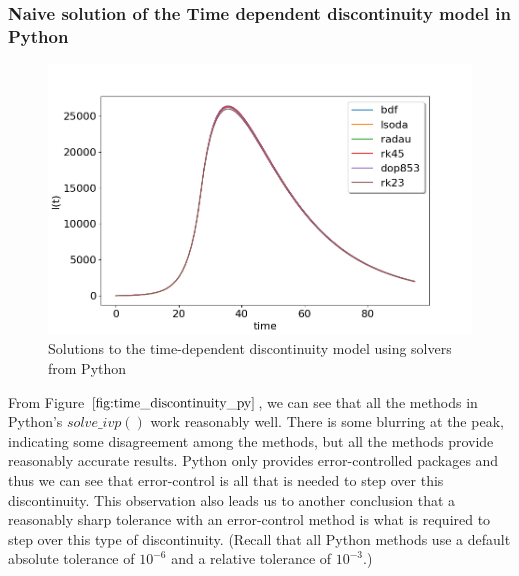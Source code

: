 \subsubsection{Naive solution of the Time dependent discontinuity model in Python}
\begin{figure}[H]
\centering
\includegraphics[width=0.7\linewidth]{./figures/time_discontinuity_py}
\caption{Solutions to the time-dependent discontinuity model using solvers from Python}
\label{fig:time_discontinuity_py}
\end{figure}
From Figure $\ref{fig:time_discontinuity_py}$, we can see that all the methods in Python's $solve\_ivp()$ work reasonably well. There is some blurring at the peak, indicating some disagreement among the methods, but all the methods provide reasonably accurate results. Python only provides error-controlled packages and thus we can see that error-control is all that is needed to step over this discontinuity. This observation also leads us to another conclusion that a reasonably sharp tolerance with an error-control method is what is required to step over this type of discontinuity. (Recall that all Python methods use a default absolute tolerance of $10^{-6}$ and a relative tolerance of $10^{-3}$.)

